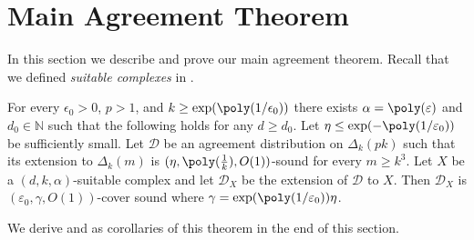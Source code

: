\section{Main Agreement Theorem}
In this section we describe and prove our main agreement theorem. Recall that we defined \emph{suitable complexes} in .

\begin{theorem}[Main] \label{thm:main}
    For every $\epsilon_0>0$, \(p > 1\), and $k \geq \exp(\poly(1/\epsilon_0))$ there exists \(\alpha = \poly(\varepsilon)\) and \(d_0\in\mathbb{N}\) such that the following holds for any \(d \geq d_0\). Let \(\eta \leq \exp(-\poly(1/\varepsilon_0))\) be sufficiently small. Let \(\mathcal{D}\) be an agreement distribution on \(\Delta_k(pk)\) such that its extension to \(\Delta_k(m)\) is \((\eta,\poly(\frac{1}{k}),O(1))\)-sound for every \(m \geq k^3\). Let \(X\) be a \((d,k,\alpha)\)-suitable complex and let \(\mathcal{D}_X\) be the extension of \(\mathcal{D}\) to $X$. Then \(\mathcal{D}_X\) is \((\varepsilon_0,\gamma,O(1))\)-cover sound where \(\gamma = \exp(\poly(1/\varepsilon_0))\eta\).
\end{theorem}
%
We derive  and  as corollaries of this theorem in the end of this section.

